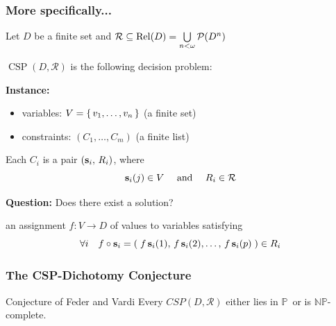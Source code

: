 \documentclass[10pt,xcolor=dvipsnames%
   ]{beamer}
\DeclareMathOperator{\Rel}{Rel}
\DeclareMathOperator{\CSP}{CSP}
\renewcommand{\.}{\cdot}
\newcommand{\sR}{\ensuremath{\mathcal{R}}}
\newcommand{\sP}{\ensuremath{\mathcal{P}}}
\newcommand{\NP}{\ensuremath{\mathbb{NP}}\xspace}
\renewcommand{\P}{\ensuremath{\mathbb{P}}\xspace}
\begin{document}
\begin{frame}  
  \frametitle{More specifically...}

  Let $D$ be a finite set and $\sR \sseq \Rel(D)= \bigcup\limits_{n< \omega} \sP(D^n)$

  $\CSP(D,\sR)$ is the following decision problem:

  \textbf{Instance:}
\vskip-3mm
  \begin{itemize}
  \item 
  \alert{variables}: $V=\left\{\,v_1,\dots,v_n\,\right\}$ (a finite set) 

\item  \alert{constraints}: $(C_1,\dots,C_m)$ (a finite list) 
  \end{itemize}
  Each $C_i$ is a pair $(\mathbf s_i,\, R_i)$, 
  where \[\bs_i(j) \in V\quad \text{ and } \quad R_i\in \sR\]

  \textbf{Question:} Does there exist a \alert{solution}? 

  an assignment $f \colon V\to D$ of values to variables satisfying
  \[\forall i \quad
  f \circ \mathbf s_i = (\; f \, \mathbf s_i(1) ,\, f\,  \mathbf s_i(2) ,\dots, \, f \, \mathbf s_i(p)  \; )\in R_i \]


\end{frame}

\begin{frame}
  \frametitle{The CSP-Dichotomy Conjecture}

  \begin{exampleblock}{Conjecture of Feder and Vardi}
  Every $CSP(D, \sR)$ either lies in \P\ or is $\NP$-complete.
  \end{exampleblock}

\end{frame}
\end{document}
